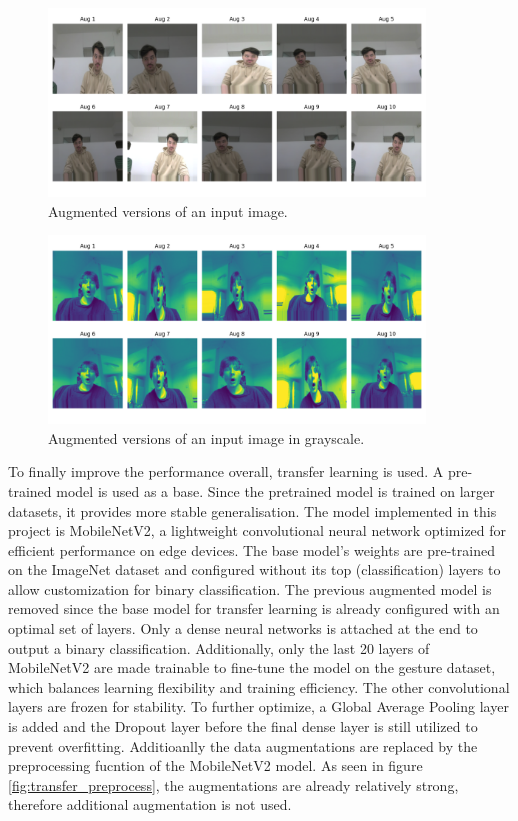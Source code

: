 \documentclass{report}
\begin{document}
\begin{figure}[H]
    \centering
    \includegraphics[height=50mm, keepaspectratio]{report_images/augmentation_preprocess.png}
    \caption{Augmented versions of an input image.}
    \label{fig:aug_preprocess}
\end{figure}
\begin{figure}[H]
    \centering
    \includegraphics[height=50mm, keepaspectratio]{report_images/aug_gray_preprocess.png}
    \caption{Augmented versions of an input image in grayscale.}
    \label{fig:gray_preprocess}
\end{figure}

To finally improve the performance overall, transfer learning is used. A pre-trained model is used as a base. Since the pretrained model is trained on larger datasets, it provides more stable generalisation. The model implemented in this project is MobileNetV2, a lightweight convolutional neural network optimized for efficient performance on edge devices.
The base model's weights are pre-trained on the ImageNet dataset and configured without its top (classification) layers to allow customization for binary classification.
The previous augmented model is removed since the base model for transfer learning is already configured with an optimal set of layers. Only a dense neural networks is attached at the end to output a binary classification. Additionally, only the last 20 layers of MobileNetV2 are made trainable to fine-tune the model on the gesture dataset, which balances learning flexibility and training efficiency. The other convolutional layers are frozen for stability. To further optimize,  a Global Average Pooling layer is added and the Dropout layer before the final dense layer is still utilized to prevent overfitting. Additioanlly the data augmentations are replaced by the preprocessing fucntion of the MobileNetV2 model. As seen in figure \ref{fig:transfer_preprocess}, the augmentations are already relatively strong, therefore additional augmentation is not used.
\end{document}
